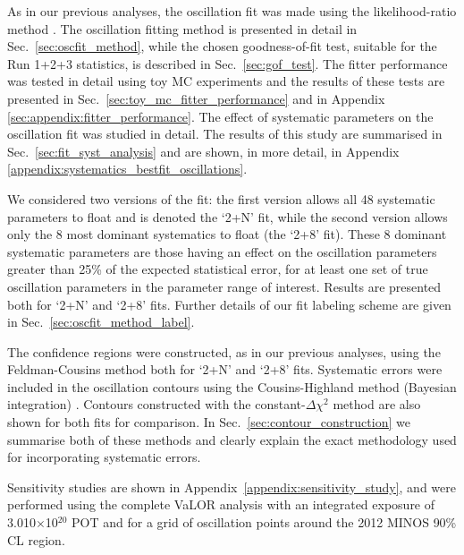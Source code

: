 As in our previous analyses, the oscillation fit was made using the likelihood-ratio method \cite{StatAnalysisCowan}.
The oscillation fitting method is presented in detail in Sec.\ \ref{sec:oscfit_method}, while the chosen
goodness-of-fit test, suitable for the Run 1+2+3 statistics, is described in Sec.\ \ref{sec:gof_test}.
The fitter performance was tested in detail using toy MC experiments 
and the results of these tests are presented in Sec.\ \ref{sec:toy_mc_fitter_performance} 
and in Appendix \ref{sec:appendix:fitter_performance}.
The effect of systematic parameters on the oscillation fit was studied in detail. 
The results of this study are summarised in Sec.\ \ref{sec:fit_syst_analysis} and are shown, 
in more detail, in Appendix \ref{appendix:systematics_bestfit_oscillations}.

We considered two versions of the fit: the first version allows all 48 systematic parameters to float 
and is denoted the `2+N' fit, while the second version allows only the 8 most dominant systematics to float 
(the `2+8' fit). These 8 dominant systematic parameters are those having an effect on the oscillation
parameters greater than 25\% of the expected statistical error, for at least one set of true oscillation
parameters in the parameter range of interest. Results are presented both for `2+N' and `2+8' fits.
Further details of our fit labeling scheme are given in Sec.\ \ref{sec:oscfit_method_label}.

The confidence regions were constructed, as in our previous analyses, 
using the Feldman-Cousins method \cite{FeldmanCousins} both for `2+N' and `2+8' fits. 
Systematic errors were included in the oscillation contours using the 
Cousins-Highland method (Bayesian integration) \cite{CousinsHighland}.
Contours constructed with the constant-$\Delta\chi^{2}$ method are also shown for both fits for comparison.
In Sec.\ \ref{sec:contour_construction} we summarise both of these methods
and clearly explain the exact methodology used for incorporating systematic errors.

Sensitivity studies are shown in Appendix\ \ref{appendix:sensitivity_study}, and were performed using the complete VaLOR analysis 
with an integrated exposure of 3.010$\times$10$^{20}$ POT and for a grid of oscillation points around the 2012 MINOS \cite{MINOS2012} 90\% CL region.

